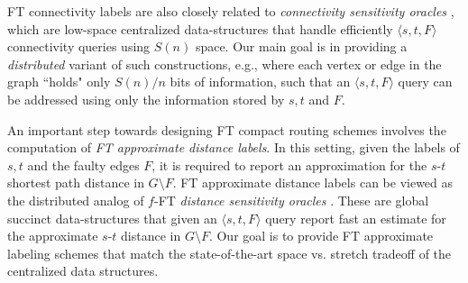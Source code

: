 FT connectivity labels are also closely related to \emph{connectivity sensitivity oracles} \cite{patrascu2007planning}, which are low-space centralized data-structures that handle efficiently $\langle s, t, F \rangle$ connectivity queries using $S(n)$ space. Our main goal is in providing a \emph{distributed} variant of such constructions, e.g., where each vertex or edge in the graph ``holds" only $S(n)/n$ bits of information, such that an $\langle s,t, F \rangle$ query can be addressed using only the information stored by $s,t$ and $F$. 

An important step towards designing FT compact routing schemes involves the computation of \emph{FT approximate distance labels}. In this setting, given the labels of $s,t$ and the faulty edges $F$, it is required to report an approximation for the $s$-$t$ shortest path distance in $G \setminus F$. %
FT approximate distance labels can be viewed as the distributed analog of $f$-FT \emph{distance sensitivity oracles} \cite{khanna2010approximate,WeimannY10}. 
These are global succinct data-structures that given an $\langle s,t,F \rangle$ query report fast an estimate for the approximate $s$-$t$ distance in $G \setminus F$. Our goal is to provide FT approximate labeling schemes that match the state-of-the-art space vs. stretch tradeoff of the centralized data structures. %

